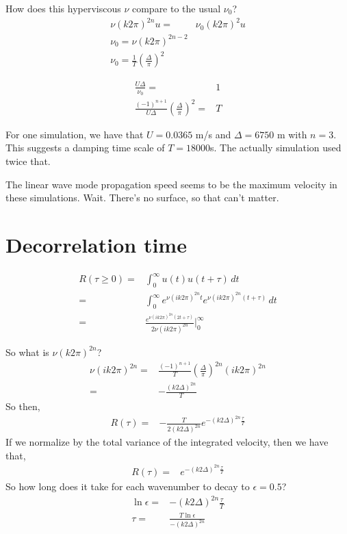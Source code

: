 \documentclass[11pt, oneside]{article}   	%
\begin{document}
How does this hyperviscous $\nu$ compare to the usual $\nu_0$?
\begin{align}
\nu (k 2 \pi)^{2n} u =& \nu_0 (k 2 \pi)^{2} u \\
\nu_0 = \nu (k 2 \pi)^{2n-2}  \\
\nu_0 = \frac{1}{T} \left( \frac{\Delta}{\pi} \right)^{2}
\end{align}

\begin{align}
 \frac{U \Delta}{\nu_0} =& 1\\
\frac{(-1)^{n+1}}{U \Delta} \left( \frac{\Delta}{\pi} \right)^{2} =& T
\end{align}

For one simulation, we have that $U = 0.0365$ m/s and $\Delta=6750$ m with $n=3$. This suggests a damping time scale of $T=18000$s. The actually simulation used twice that.

The linear wave mode propagation speed seems to be the maximum velocity in these simulations. Wait. There's no surface, so that can't matter.

%
\section{Decorrelation time}
%

\begin{align}
R(\tau \geq 0) =& \int_0^\infty u(t)u(t+\tau) \, dt \\
=& \int_0^\infty e^{\nu (i k 2 \pi)^{2n} t} e^{\nu (i k 2 \pi)^{2n} (t + \tau) } \, dt \\
=& \frac{e^{ \nu (i k 2 \pi)^{2n} (2t + \tau)}}{2 \nu (i k 2 \pi)^{2n}} \biggr\rvert_0^\infty
\end{align}

So what is $\nu (k 2 \pi)^{2n}$?
\begin{align}
\nu (i k 2 \pi)^{2n} =&  \frac{(-1)^{n+1}}{T} \left( \frac{\Delta}{\pi} \right)^{2n}(i k 2 \pi)^{2n} \\
=& - \frac{(k 2 \Delta)^{2n}}{T} 
\end{align}
So then,
\begin{align}
R(\tau) =&- \frac{T} {2(k 2 \Delta)^{2n}} e^{ - (k 2 \Delta)^{2n}\frac{\tau}{T}} 
\end{align}
If we normalize by the total variance of the integrated velocity, then we have that,
\begin{align}
R(\tau) =& e^{ - (k 2 \Delta)^{2n}\frac{\tau}{T}} 
\end{align}
So how long does it take for each wavenumber to decay to $\epsilon=0.5$?
\begin{align}
\ln \epsilon =& - (k 2 \Delta)^{2n}\frac{\tau}{T} \\
\tau =& \frac{T \ln \epsilon}{- (k 2 \Delta)^{2n}}
\end{align}
\end{document}
